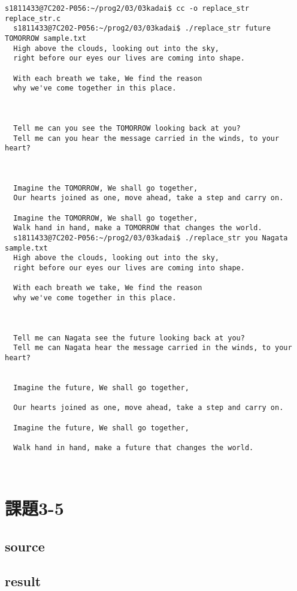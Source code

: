 \documentclass[10pt,a4paper]{jsarticle}
\begin{document}
\begin{lstlisting}[basicstyle=\ttfamily\footnotesize,frame=single]
  s1811433@7C202-P056:~/prog2/03/03kadai$ cc -o replace_str replace_str.c
  s1811433@7C202-P056:~/prog2/03/03kadai$ ./replace_str future TOMORROW sample.txt
  High above the clouds, looking out into the sky,
  right before our eyes our lives are coming into shape.

  With each breath we take, We find the reason
  why we've come together in this place.



  Tell me can you see the TOMORROW looking back at you?
  Tell me can you hear the message carried in the winds, to your heart?



  Imagine the TOMORROW, We shall go together,
  Our hearts joined as one, move ahead, take a step and carry on.

  Imagine the TOMORROW, We shall go together,
  Walk hand in hand, make a TOMORROW that changes the world.
  s1811433@7C202-P056:~/prog2/03/03kadai$ ./replace_str you Nagata sample.txt
  High above the clouds, looking out into the sky,
  right before our eyes our lives are coming into shape.

  With each breath we take, We find the reason
  why we've come together in this place.



  Tell me can Nagata see the future looking back at you?
  Tell me can Nagata hear the message carried in the winds, to your heart?


  Imagine the future, We shall go together,

  Our hearts joined as one, move ahead, take a step and carry on.

  Imagine the future, We shall go together,

  Walk hand in hand, make a future that changes the world.

  
\end{lstlisting}

\section{課題3-5}
\subsection{source}


\subsection{result}
\end{document}
